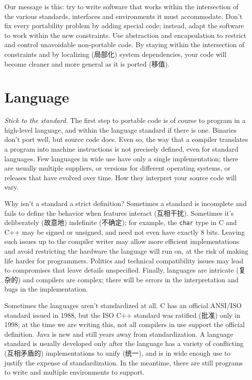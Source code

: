 Our message is this: try to write software that works within the
intersection of the various standards, interfaces and environments it must
accommodate. Don't fix every portability problem by adding special code;
instead, adapt the software to work within the new constraints. Use
abstraction and encapsulation to restrict and control unavoidable
non-portable code. By staying within the intersection of constraints and by
localizing (局部化) system dependencies, your code will become cleaner and
more general as it is ported (移值).

\section{Language}
\label{sec:language}

\emph{Stick to the standard.} The first step to portable code is of course
to program in a high-level language, and within the language standard if
there is one.  Binaries don't port well, but source code does. Even so, the
way that a compiler translates a program into machine instructions is not
precisely defined, even for standard languages.  Few languages in wide use
have only a single implementation; there are usually multiple suppliers,
or versions for different operating systems, or releases that have evolved
over time. How they interpret your source code will vary.

Why isn't a standard a strict definition? Sometimes a standard is
incomplete and fails to define the behavior when features interact
(互相干扰). Sometimes it's deliberately (故意地) indefinite (不确定); for
example, the \verb'char' type in C and C++ may be signed or unsigned, and
need not even have exactly 8 bits. Leaving such issues up to the compiler
writer may allow more efficient implementations and avoid restricting the
hardware the language will run on, at the risk of making life harder for
programmers. Politics and technical compatibility issues may lead to
compromises that leave details unspecified.  Finally, languages are
intricate (复杂的) and compilers are complex; there will be errors in the
interpretation and bugs in the implementation.

Sometimes the languages aren't standardized at all. C has an official
ANSI/ISO standard issued in 1988, but the ISO C++ standard was ratified
(批准) only in 1998; at the time we are writing this, not all compilers in
use support the official definition. Java is new and still years away from
standardization. A language standard is usually developed only after the
language has a variety of conflicting (互相矛盾的) implementations to unify
(统一), and is in wide enough use to justify the expense of
standardization.  In the meantime, there are still programs to write and
multiple environments to support.

